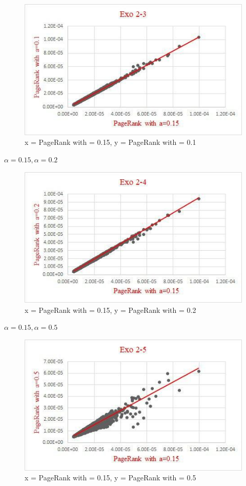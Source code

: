 \documentclass[a4paper,10pt]{report}
\begin{document}
\begin{figure}[H]
  \caption{x = PageRank with  = 0.15, y = PageRank with  = 0.1}
  \centering
    \includegraphics{./Datas/pageRank/pageRankAlpha015PageRankAlpha01.jpg}
\end{figure}
$\alpha = 0.15,\alpha= 0.2$
\begin{figure}[H]
  \caption{x = PageRank with  = 0.15, y = PageRank with  = 0.2}
  \centering
    \includegraphics{./Datas/pageRank/pageRankAlpha015Alpha02.jpg}
\end{figure}
$\alpha =0.15,\alpha=0.5$
\begin{figure}[H]
  \caption{x = PageRank with  = 0.15, y = PageRank with  = 0.5}
  \centering
    \includegraphics{./Datas/pageRank/pageRankAlpha015Alpha05.jpg}
\end{figure}
\end{document}
